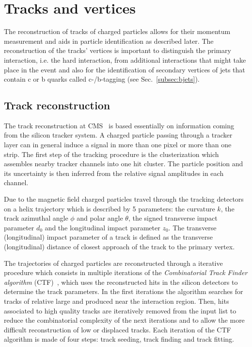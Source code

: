 \section{Tracks and vertices}\label{sec:tracksandvtx}

The reconstruction of tracks of charged particles allows for their momentum measurement and aids in particle identification as described later. The reconstruction of the tracks' vertices is important to distinguish the primary interaction, i.e. the hard interaction, from additional interactions that might take place in the event and also for the identification of secondary vertices of jets that contain c or b quarks called c-/b-tagging (see Sec.~\ref{subsec:bjets}).

\subsection{Track reconstruction}\label{subsec:tracks}

The track reconstruction at CMS~\cite{Chatrchyan:2014fea} is based essentially on information coming from the silicon tracker system. A charged particle passing through a tracker layer can in general induce a signal in more than one pixel or more than one strip. The first step of the tracking procedure is the clusterization which assembles nearby tracker channels into one hit cluster. The particle position and its uncertainty is then inferred from the relative signal amplitudes in each channel.

Due to the magnetic field charged particles travel through the tracking detectors on a helix trajectory which is described by 5 parameters: the curvature $k$, the track azimuthal angle $\phi$ and polar angle $\theta$, the signed transverse impact parameter $d_0$ and the longitudinal impact parameter $z_0$. The transverse (longitudinal) impact parameter of a track is defined as the transverse (longitudinal) distance of closest approach of the track to the primary vertex.

The trajectories of charged particles are reconstructed through a iterative procedure which consists in multiple iterations of the {\itshape Combinatorial Track Finder algorithm} (CTF)~\cite{Adam:934067}, which uses the reconstructed hits in the silicon detectors to determine the track parameters. In the first iterations the algorithm searches for tracks of relative large \pt and produced near the interaction region. Then, hits associated to high quality tracks are iteratively removed from the input list to reduce the combinatorial complexity of the next iterations and to allow the more difficult reconstruction of low \pt or displaced tracks. Each iteration of the CTF algorithm is made of four steps: track seeding, track finding and track fitting.

